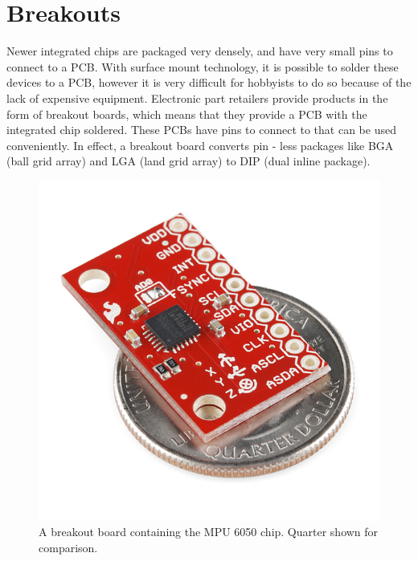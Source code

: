 \section{Breakouts}
\label{Sec:Breakouts}
Newer integrated chips are packaged very densely,
and have very small pins to connect to a PCB.
With surface mount technology, it is possible to solder these devices to a PCB,
however it is very difficult for hobbyists to do so
because of the lack of expensive equipment.
Electronic part retailers provide products in the form of breakout boards,
which means that they provide a PCB with the integrated chip soldered.
These PCBs have pins to connect to that can be used conveniently.
In effect, a breakout board converts pin - less packages like
BGA (ball grid array) and LGA (land grid array) to DIP (dual inline package).
\begin{figure}
\begin{center}
\includegraphics{images/MPUBreakout.jpg}
\caption{A breakout board containing the MPU 6050 chip. Quarter shown for comparison.}
\label{Fig:MPUBreakOut}
\end{center}
\end{figure}

